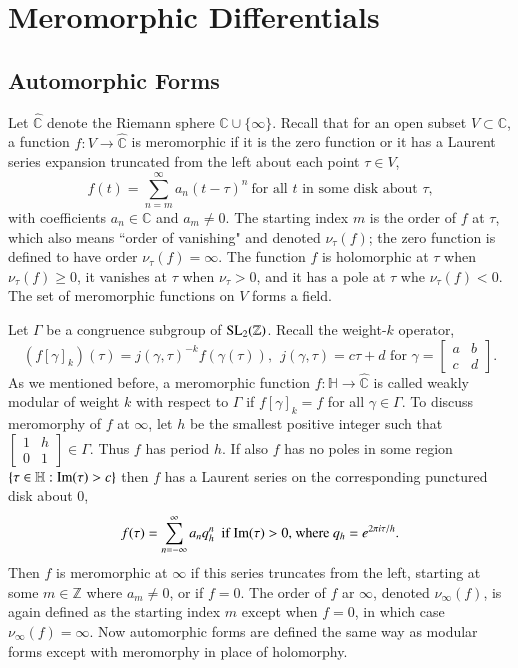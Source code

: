 \section{Meromorphic Differentials}
\subsection{Automorphic Forms}
Let $\hat{\mathbb{C}}$ denote the Riemann sphere $\mathbb{C}\cup \{\infty\}$. Recall that for an open subset 
$V\subset \mathbb{C}$, a function $f:V\rightarrow \hat{\mathbb{C}}$ is meromorphic if it is the zero function
or it has a Laurent series expansion truncated from the left about each point $\tau \in V$,
\begin{equation*}
    f(t)=\sum_{n=m}^{\infty} a_n (t-\tau)^n \ \text{for all $t$ in some disk about $\tau$,}
\end{equation*}
with coefficients $a_n \in \mathbb{C}$ and $a_m \neq 0$. The starting index $m$ is the order of $f$ at $\tau$, 
which also means ``order of vanishing" and denoted $\nu_{\tau} (f)$; the zero function is defined to have 
order $\nu_{\tau}(f)=\infty$. The function $f$ is holomorphic at $\tau$ when $\nu_{\tau}(f)\geqslant 0$,
it vanishes at $\tau$ when $\nu_{\tau}>0$, and it has a pole at $\tau$ whe $\nu_{\tau}(f)<0$. The set of meromorphic
functions on $V$ forms a field.\par
Let $\Gamma$ be a congruence subgroup of ${\rm SL_2} (\mathbb{Z})$. Recall the weight-$k$ operator, 
\begin{equation*}
    (f[\gamma]_k)(\tau)=j(\gamma,\tau)^{-k}f(\gamma(\tau)), \ \ j(\gamma,\tau)=c\tau +d \text{ for } \gamma=
    \begin{bmatrix}
        a & b \\
        c & d
    \end{bmatrix}.
\end{equation*}
As we mentioned before, a meromorphic function $f:\mathbb{H}\rightarrow \hat{\mathbb{C}}$ is called weakly
modular of weight $k$ with respect to $\Gamma$ if $f[\gamma]_k=f$ for all $\gamma\in \Gamma$. To discuss 
meromorphy of $f$ at $\infty$, let $h$ be the smallest positive integer such that 
$\begin{bmatrix}
    1 & h \\
    0 & 1
\end{bmatrix} \in \Gamma$. Thus $f$ has period $h$. If also $f$ has no poles in some region 
$\{\tau \in \mathbb{H}:{\rm Im}(\tau)>c\}$ then $f$ has a Laurent series on the corresponding punctured disk
about $0$,
\begin{equation*}
    f(\tau)=\sum_{n=-\infty}^{\infty} a_n q_h^n \ \text{  if ${\rm Im}(\tau)>0$, where $q_h=e^{2\pi i \tau /h}$}.
\end{equation*}
Then $f$ is meromorphic at $\infty$ if this series truncates from the left, starting at some $m\in\mathbb{Z}$
where $a_m\neq0$, or if $f=0$. The order of $f$ ar $\infty$, denoted $\nu_{\infty}(f)$, is again defined as the
starting index $m$ except when $f=0$, in which case $\nu_{\infty}(f)=\infty$. Now automorphic forms are defined
the same way as modular forms except with meromorphy in place of holomorphy.


